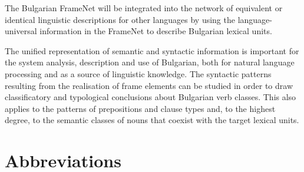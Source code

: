 \documentclass[output=paper,colorlinks,citecolor=brown]{langscibook}
\begin{document}
The Bulgarian FrameNet will be integrated into the network of equivalent or identical linguistic descriptions for other languages by using the language-universal information in the FrameNet to describe Bulgarian lexical units.

The unified representation of semantic and syntactic information is important for the system analysis, description and use of Bulgarian, both for natural language processing and as a source of linguistic knowledge. The syntactic patterns resulting from the realisation of frame elements can be studied in order to draw classificatory and typological conclusions about Bulgarian verb classes. This also applies to the patterns of prepositions and clause types and, to the highest degree, to the semantic classes of nouns that coexist with the target lexical units.

\section*{Abbreviations}
\end{document}
